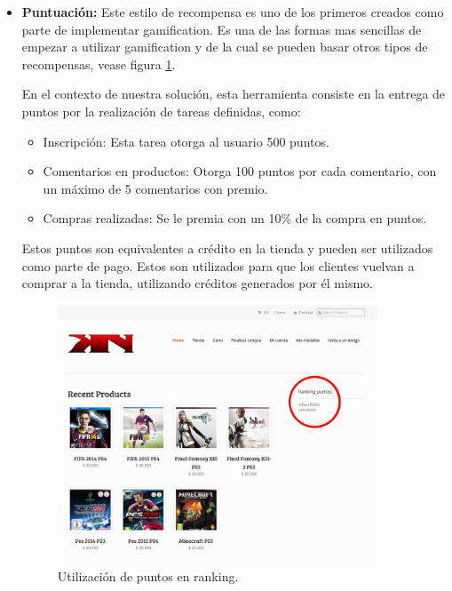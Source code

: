\begin{itemize}
    \item {\bf Puntuación:}
	Este estilo de recompensa es uno de los primeros creados como parte de
	implementar gamification. Es una de las formas mas sencillas de empezar
 	a utilizar gamification\cite{OnlineComp} y de la cual se pueden basar otros tipos de recompensas,
	vease figura \ref{fig:ranking}.

        En el contexto de nuestra solución, esta herramienta consiste en la entrega de
	puntos por la realización de tareas definidas, como:

    \begin{itemize}
        \item Inscripción:
            Esta tarea otorga al usuario 500 puntos.
        \item Comentarios en productos:
            Otorga 100 puntos por cada comentario, con un máximo de 5 comentarios
            con premio.
        \item Compras realizadas:
            Se le premia con un 10\% de la compra en puntos.
    \end{itemize}

        Estos puntos son equivalentes a crédito en la tienda y pueden ser
        utilizados como parte de pago.
        Estos son utilizados para que los clientes vuelvan a comprar a la tienda,
        utilizando créditos generados por él mismo.

\begin{figure}[!htb]
  \centering
  \includegraphics[width=0.9\textwidth]{images/Tienda/Tienda_ranking.png}
  \caption[Ranking puntos]{Utilización de puntos en ranking.}
  \label{fig:ranking}
\end{figure}



\end{itemize}
